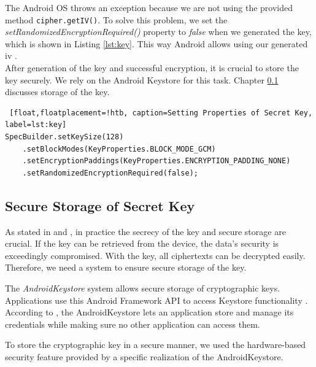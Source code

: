 The Android OS throws an exception because we are not using the provided method \texttt{cipher.getIV()}. To solve this problem, we set the \textit{setRandomizedEncryptionRequired()} property to \textit{false} when we generated the key, which is shown in Listing \ref{lst:key}. This way Android allows using our generated \gls{iv} \cite{SecretsInAndroid}. \\
After generation of the key and successful encryption, it is crucial to store the key securely. We rely on the Android Keystore for this task. Chapter \ref{arch_keystore} discusses storage of the key. \\


\begin{lstlisting} [float,floatplacement=!htb, caption=Setting Properties of Secret Key, label=lst:key]
SpecBuilder.setKeySize(128)
    .setBlockModes(KeyProperties.BLOCK_MODE_GCM)
    .setEncryptionPaddings(KeyProperties.ENCRYPTION_PADDING_NONE)
    .setRandomizedEncryptionRequired(false);
\end{lstlisting}




\subsection{Secure Storage of Secret Key} \label{arch_keystore}
As stated in \cite{dworkin2007sp} and \cite{CooijmansRP14},  in practice the secrecy of the key and secure storage are crucial. If the key can be retrieved from the device, the data's security is exceedingly compromised. With the key, all ciphertexts can be decrypted easily. Therefore, we need a system to ensure secure storage of the key.

The \textit{AndroidKeystore} system allows secure storage of cryptographic keys. Applications use this Android Framework API  to access Keystore functionality \cite{HWBKeyStore}. According to \cite{AndroidKeyStoreSystem}, the AndroidKeystore lets an application store and manage its credentials while making sure no other application can access them.

To store the cryptographic key in a secure manner, we used the hardware-based security feature provided by a specific realization of the AndroidKeystore. 

